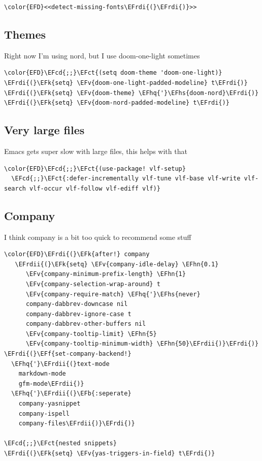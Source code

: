 \documentclass{scrartcl}
\newcommand{\EFk}[1]{\textcolor{EFk}{#1}} %
\newcommand{\EFb}[1]{\textcolor{EFb}{#1}} %
\newcommand{\EFct}[1]{\textcolor{EFct}{#1}} %
\newcommand{\EFv}[1]{\textcolor{EFv}{#1}} %
\newcommand{\EFf}[1]{\textcolor{EFf}{#1}} %
\newcommand{\EFcd}[1]{\textcolor{EFcd}{#1}} %
\newcommand{\EFhn}[1]{\textcolor{EFhn}{\textbf{#1}}} %
\newcommand{\EFhq}[1]{\textcolor{EFhq}{#1}} %
\newcommand{\EFhs}[1]{\textcolor{EFhs}{#1}} %
\newcommand{\EFrdi}[1]{\textcolor{EFrdi}{#1}} %
\newcommand{\EFrdii}[1]{\textcolor{EFrdii}{#1}} %
\begin{document}
\begin{Code}
\begin{Verbatim}[]
\color{EFD}<<detect-missing-fonts\EFrdi{(}\EFrdi{)}>>
\end{Verbatim}
\end{Code}

\subsection{Themes}
\label{sec:org78b6e21}
Right now I'm using nord, but I use doom-one-light sometimes
\begin{Code}
\begin{Verbatim}[]
\color{EFD}\EFcd{;;}\EFct{(setq doom-theme 'doom-one-light)}
\EFrdi{(}\EFk{setq} \EFv{doom-one-light-padded-modeline} t\EFrdi{)}
\EFrdi{(}\EFk{setq} \EFv{doom-theme} \EFhq{'}\EFhs{doom-nord}\EFrdi{)}
\EFrdi{(}\EFk{setq} \EFv{doom-nord-padded-modeline} t\EFrdi{)}
\end{Verbatim}
\end{Code}

\subsection{Very large files}
\label{sec:org73b0ff7}
Emacs gets super slow with large files, this helps with that
\begin{Code}
\begin{Verbatim}[]
\color{EFD}\EFcd{;;}\EFct{(use-package! vlf-setup}
  \EFcd{;;}\EFct{:defer-incrementally vlf-tune vlf-base vlf-write vlf-search vlf-occur vlf-follow vlf-ediff vlf)}
\end{Verbatim}
\end{Code}

\subsection{Company}
\label{sec:org26527a2}
I think company is a bit too quick to recommend some stuff
\begin{Code}
\begin{Verbatim}[]
\color{EFD}\EFrdi{(}\EFk{after!} company
   \EFrdii{(}\EFk{setq} \EFv{company-idle-delay} \EFhn{0.1}
      \EFv{company-minimum-prefix-length} \EFhn{1}
      \EFv{company-selection-wrap-around} t
      \EFv{company-require-match} \EFhq{'}\EFhs{never}
      company-dabbrev-downcase nil
      company-dabbrev-ignore-case t
      company-dabbrev-other-buffers nil
      \EFv{company-tooltip-limit} \EFhn{5}
      \EFv{company-tooltip-minimum-width} \EFhn{50}\EFrdii{)}\EFrdi{)}
\EFrdi{(}\EFf{set-company-backend!}
  \EFhq{'}\EFrdii{(}text-mode
    markdown-mode
    gfm-mode\EFrdii{)}
  \EFhq{'}\EFrdii{(}\EFb{:seperate}
    company-yasnippet
    company-ispell
    company-files\EFrdii{)}\EFrdi{)}

\EFcd{;;}\EFct{nested snippets}
\EFrdi{(}\EFk{setq} \EFv{yas-triggers-in-field} t\EFrdi{)}
\end{Verbatim}
\end{Code}
\end{document}
